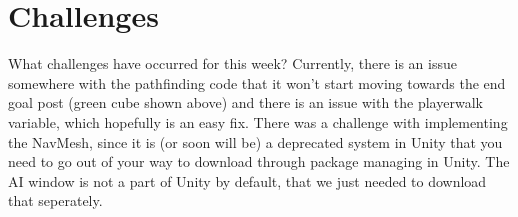 \section{Challenges}

What challenges have occurred for this week? Currently, there is an issue somewhere with the pathfinding code that it won't start moving towards the end goal post (green cube shown above) and there is an issue with the playerwalk variable, which hopefully is an easy fix. There was a challenge with implementing the NavMesh, since it is (or soon will be) a deprecated  system in Unity that you need to go out of your way to download through package managing in Unity. The AI window is not a part of Unity by default, that we just needed to download that seperately. 